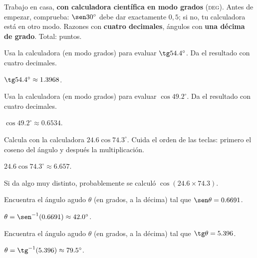 \documentclass[11pt]{article}
\begin{document}
\encabezado

\begin{instrucciones}
Trabajo en casa, \textbf{con calculadora científica en modo grados} (\textsc{deg}). Antes de
empezar, comprueba: $\sen 30^\circ$ debe dar exactamente $0{,}5$; si no, tu calculadora está
en otro modo. Razones con \textbf{cuatro decimales}, ángulos con \textbf{una décima de grado}.
Total: \totalpuntos{} puntos.
\end{instrucciones}

\begin{preguntas}

\pregunta[0.5] Usa la calculadora (en modo grados) para evaluar $\tg \num{54,4}^\circ$. Da el
resultado con cuatro decimales.
\begin{solucion}[1.8cm]
$\tg \num{54,4}^\circ \approx \num{1,3968}$.
\end{solucion}

\pregunta[0.5] Usa la calculadora (en modo grados) para evaluar $\cos \num{49,2}^\circ$. Da el
resultado con cuatro decimales.
\begin{solucion}[1.8cm]
$\cos \num{49,2}^\circ \approx \num{0,6534}$.
\end{solucion}

\pregunta[1] Calcula con la calculadora $\num{24,6} \cos \num{74,3}^\circ$. Cuida el orden de
las teclas: primero el coseno del ángulo y después la multiplicación.
\begin{solucion}[2.5cm]
$\num{24,6} \cos \num{74,3}^\circ \approx \num{6,657}$.

Si da algo muy distinto, probablemente se calculó $\cos(\num{24,6} \times \num{74,3})$.
\end{solucion}

\pregunta[1] Encuentra el ángulo agudo $\theta$ (en grados, a la décima) tal que
$\sen \theta = \num{0,6691}$.
\begin{solucion}[2.5cm]
$\theta = \sen^{-1}(\num{0,6691}) \approx \num{42,0}^\circ$.
\end{solucion}

\pregunta[1] Encuentra el ángulo agudo $\theta$ (en grados, a la décima) tal que
$\tg \theta = \num{5,396}$.
\begin{solucion}[2.5cm]
$\theta = \tg^{-1}(\num{5,396}) \approx \num{79,5}^\circ$.


\end{solucion}
\end{preguntas}
\end{document}

